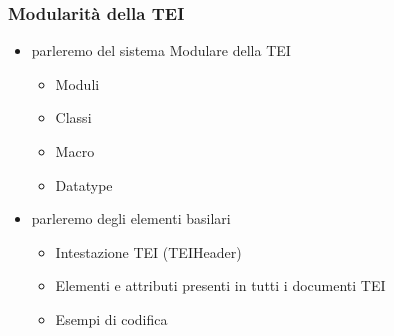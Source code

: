 
    \begin{frame}
        \frametitle{Modularità della TEI}
        \addtocounter{nframe}{1}
        
    
        \begin{itemize}
            
            \item<1-> parleremo del sistema Modulare della TEI
                \begin{itemize}
                    \item<1-> Moduli
                    \item<1-> Classi
                    \item<1-> Macro
                    \item<1-> Datatype
                \end{itemize} 
            \item<2-> parleremo degli elementi basilari
                \begin{itemize}
                    \item<2-> Intestazione TEI (TEIHeader)
                    \item<2-> Elementi e attributi presenti in tutti i documenti TEI
                    \item<2-> Esempi di codifica
                \end{itemize} 
        \end{itemize}
        
    \end{frame}